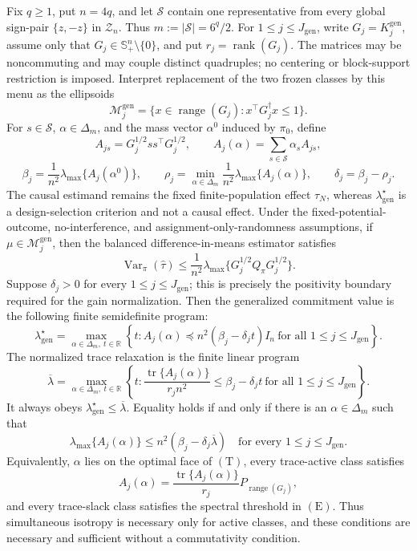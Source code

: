 Fix \(q\ge1\), put \(n=4q\), and let \(\mathscr S\) contain one representative from every global sign-pair \(\{z,-z\}\) in \(\mathcal Z_n\). Thus \(m:=|\mathscr S|=6^q/2\). For \(1\le j\le J_{\mathrm{gen}}\), write \(G_j=K_j^{\mathrm{gen}}\), assume only that \(G_j\in\mathbb S_+^n\setminus\{0\}\), and put \(r_j=\operatorname{rank}(G_j)\). The matrices may be noncommuting and may couple distinct quadruples; no centering or block-support restriction is imposed. Interpret replacement of the two frozen classes by this menu as the ellipsoids
\[
\mathcal M_j^{\mathrm{gen}}
=\{x\in\operatorname{range}(G_j):x^\top G_j^\dagger x\le1\}.
\]
For \(s\in\mathscr S\), \(\alpha\in\Delta_m\), and the mass vector \(\alpha^0\) induced by \(\pi_0\), define
\[
A_{js}=G_j^{1/2}ss^\top G_j^{1/2},
\qquad
A_j(\alpha)=\sum_{s\in\mathscr S}\alpha_sA_{js},
\]
\[
\beta_j=\frac1{n^2}\lambda_{\max}\{A_j(\alpha^0)\},
\qquad
\rho_j=\min_{\alpha\in\Delta_m}\frac1{n^2}\lambda_{\max}\{A_j(\alpha)\},
\qquad
\delta_j=\beta_j-\rho_j.
\]
The causal estimand remains the fixed finite-population effect \(\tau_N\), whereas \(\lambda_{\mathrm{gen}}^\star\) is a design-selection criterion and not a causal effect. Under the fixed-potential-outcome, no-interference, and assignment-only-randomness assumptions, if \(\mu\in\mathcal M_j^{\mathrm{gen}}\), then the balanced difference-in-means estimator satisfies
\[
\operatorname{Var}_\pi(\widehat\tau)
\le \frac1{n^2}\lambda_{\max}
\{G_j^{1/2}Q_\pi G_j^{1/2}\}.
\]
Suppose \(\delta_j>0\) for every \(1\le j\le J_{\mathrm{gen}}\); this is precisely the positivity boundary required for the gain normalization. Then the generalized commitment value is the following finite semidefinite program:
\[
\boxed{
\lambda_{\mathrm{gen}}^\star
=\max_{\alpha\in\Delta_m,\ t\in\mathbb R}
\left\{t:
A_j(\alpha)\preceq n^2(\beta_j-\delta_jt)I_n
\ \text{for all }1\le j\le J_{\mathrm{gen}}
\right\}.}
\tag{P}
\]
The normalized trace relaxation is the finite linear program
\[
\overline\lambda
=\max_{\alpha\in\Delta_m,\ t\in\mathbb R}
\left\{t:
\frac{\operatorname{tr}\{A_j(\alpha)\}}{r_jn^2}
\le\beta_j-\delta_jt
\ \text{for all }1\le j\le J_{\mathrm{gen}}
\right\}.
\tag{T}
\]
It always obeys \(\lambda_{\mathrm{gen}}^\star\le\overline\lambda\). Equality holds if and only if there is an \(\alpha\in\Delta_m\) such that
\[
\lambda_{\max}\{A_j(\alpha)\}
\le n^2(\beta_j-\delta_j\overline\lambda)
\quad\text{for every }1\le j\le J_{\mathrm{gen}}.
\tag{E}
\]
Equivalently, \(\alpha\) lies on the optimal face of \((\mathrm T)\), every trace-active class satisfies
\[
A_j(\alpha)
=\frac{\operatorname{tr}\{A_j(\alpha)\}}{r_j}
P_{\operatorname{range}(G_j)},
\tag{I}
\]
and every trace-slack class satisfies the spectral threshold in \((\mathrm E)\). Thus simultaneous isotropy is necessary only for active classes, and these conditions are necessary and sufficient without a commutativity condition.

